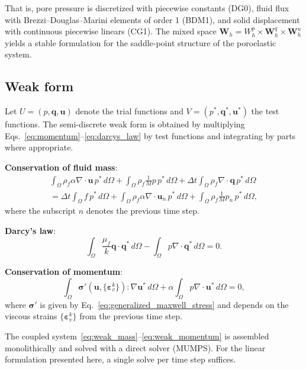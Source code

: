 \documentclass[a4paper,fleqn,longmktitle]{cas-sc}
\begin{document}
That is, pore pressure is discretized with piecewise constants (DG0), fluid
flux with Brezzi--Douglas--Marini elements of order 1 (BDM1), and solid
displacement with continuous piecewise linears (CG1). The mixed space
$\bm{W}_h = W_h^p \times \bm{W}_h^q \times \bm{W}_h^u$ yields a stable
formulation for the saddle-point structure of the poroelastic system.

\subsection{Weak form}

Let $U = (p, \bm{q}, \bm{u})$ denote the trial functions and $V = (p^*, \bm{q}^*,
\bm{u}^*)$ the test functions. The semi-discrete weak form is obtained by
multiplying Eqs.~\eqref{eq:momentum}--\eqref{eq:darcys_law} by test functions
and integrating by parts where appropriate.

\noindent\textbf{Conservation of fluid mass}:
\begin{multline}
\int_\Omega \rho_f \alpha \nabla\cdot\bm{u} \, p^* \, d\Omega
+ \int_\Omega \rho_f \frac{1}{M} p \, p^* \, d\Omega
+ \Delta t \int_\Omega \rho_f \nabla\cdot\bm{q} \, p^* \, d\Omega \\
= \Delta t \int_\Omega f \, p^* \, d\Omega
+ \int_\Omega \rho_f \alpha \nabla\cdot\bm{u}_n \, p^* \, d\Omega
+ \int_\Omega \rho_f \frac{1}{M} p_n \, p^* \, d\Omega,
\label{eq:weak_mass}
\end{multline}
where the subscript $n$ denotes the previous time step.

\noindent\textbf{Darcy's law}:
\begin{equation}
\int_\Omega \frac{\mu_f}{k} \bm{q} \cdot \bm{q}^* \, d\Omega
- \int_\Omega p \nabla\cdot\bm{q}^* \, d\Omega = 0.
\label{eq:weak_darcy}
\end{equation}

\noindent\textbf{Conservation of momentum}:
\begin{equation}
\int_\Omega \bm{\sigma}'(\bm{u}, \{\bm{\varepsilon}_v^k\}) : \nabla\bm{u}^* \, d\Omega
+ \alpha \int_\Omega p \nabla\cdot\bm{u}^* \, d\Omega = 0,
\label{eq:weak_momentum}
\end{equation}
where $\bm{\sigma}'$ is given by Eq.~\eqref{eq:generalized_maxwell_stress} and
depends on the viscous strains $\{\bm{\varepsilon}_v^k\}$ from the previous
time step.

The coupled system~\eqref{eq:weak_mass}--\eqref{eq:weak_momentum} is assembled
monolithically and solved with a direct solver (MUMPS). For the linear
formulation presented here, a single solve per time step suffices.
\end{document}
